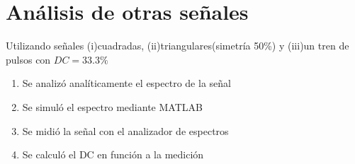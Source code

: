 \chapter{Análisis de otras señales}
Utilizando señales (i)cuadradas, (ii)triangulares(simetría 50\%) y (iii)un tren de pulsos con $DC=33.3\%$
\begin{enumerate}
    \item Se analizó analíticamente el espectro de la señal
    \item Se simuló el espectro mediante MATLAB
    \item Se midió la señal con el analizador de espectros
    \item Se calculó el DC en función a la medición
\end{enumerate}